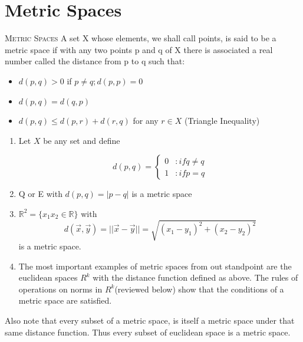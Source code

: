 \documentclass{tufte-book}
\theoremstyle{definition}
\numberwithin{section}{chapter}
\begin{document}
\section{Metric Spaces}

\textsc{Metric Spaces}  A set X whose elements, we shall call points, is said to be a metric space if with any two points p and q of X there is associated a real number called the distance from p to q such that:

\begin{itemize}
	\item $d(p,q) > 0$ if $p \neq q  ; d(p,p) = 0$
	\item $d(p,q) = d(q,p)$
	\item $d(p,q) \leq d(p,r) + d(r,q)$ for any $r \in X$  (Triangle Inequality)
\end{itemize}

\begin{enumerate}
	\item Let $X$ be any set and define
		
\begin{displaymath}
   d(p,q) = \left\{
     \begin{array}{lr}
       0 & : if q \neq q \\
       1 & : if p =q
     \end{array}
   \right.
 \end{displaymath} 
 
 \item Q or E with $d(p,q) =|p-q|$ is a metric space
 
 \item  $\mathbb{R}^2 = \{x_1 x_2 \in \mathbb{R}\}$ with
 \[d(\vec{x}, \vec{y}) = ||\vec{x}- \vec{y}|| = \sqrt{(x_1 - y_1)^2  + (x_2 - y_2)^2} \]  is a metric space.
 
 \item  The most important examples of metric spaces from out standpoint are the euclidean spaces $R^k$ with the distance function defined as above.  The rules of operations on norms  in $R^k$(reviewed below) show that the conditions of a metric space are satisfied.
		
\end{enumerate}

Also note that every subset of a metric space, is itself a metric space under that same distance function.  Thus every subset of euclidean space is a metric space.
\end{document}
